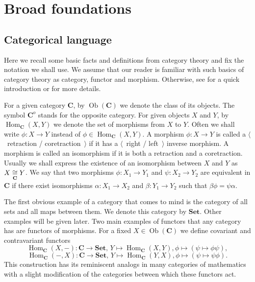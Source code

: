 
\section{
  Broad foundations}\label{SectionBroadFoundations} 


\subsection{
  Categorical language}\label{SubSectionCategoricalLanguage}

Here we recall some basic facts and definitions from category theory and fix
the notation we shall use. We assume that our reader is familiar with such basics of
category theory as category, functor and morphism. Otherwise, see
\cite[chapter 0]{HelLectAndExOnFuncAn} for a quick introduction or
\cite[chapter 1]{KashivShapCatsAndSheavs} for more details.

For a given category $\mathbf{C}$, by $\operatorname{Ob}(\mathbf{C})$ we denote
the class of its objects. The symbol $\mathbf{C}^o$ stands for the opposite
category. For given objects $X$ and $Y$, by 
$\operatorname{Hom}_{\mathbf{C}}(X, Y)$ 
we denote the set of morphisms from $X$ to $Y$. Often we shall write
$\phi:X\to Y$ instead of $\phi\in\operatorname{Hom}_{\mathbf{C}}(X,Y)$. A
morphism $\phi:X\to Y$ is called a $\langle$~retraction / coretraction~$\rangle$
if it has a $\langle$~right / left~$\rangle$ inverse morphism. A morphism 
is called an isomorphism if it is both a retraction and a coretraction. Usually we shall
express the existence of an isomorphism between $X$ and $Y$ as $X\mathrel{\mathop{\cong}\limits_{\mathbf{C}}} Y$.
We say that two morphisms $\phi:X_1\to Y_1$ and $\psi:X_2\to Y_2$ are equivalent
in $\mathbf{C}$ if there exist isomorphisms $\alpha:X_1\to X_2$ and
$\beta:Y_1\to Y_2$ such that $\beta\phi=\psi\alpha$.

The first obvious example of a category that comes to mind is the category of
all sets and all maps between them. We denote this category by $\mathbf{Set}$.
Other examples will be given later. Two main examples of functors that any
category has are functors of morphisms. For a fixed
$X\in\operatorname{Ob}(\mathbf{C})$ we define covariant and contravariant
functors
\[
\operatorname{Hom}_{\mathbf{C}}(X,-)
:\mathbf{C}\to\mathbf{Set},\,
Y\mapsto \operatorname{Hom}_{\mathbf{C}}(X,Y), 
\phi\mapsto(\psi\mapsto \phi\psi),
\]
\[
\operatorname{Hom}_{\mathbf{C}}(-,X)
:\mathbf{C}\to\mathbf{Set},\,
Y\mapsto \operatorname{Hom}_{\mathbf{C}}(Y,X), 
\phi\mapsto(\psi\mapsto \psi\phi).
\]
This construction has its reminiscent analogs in many categories of mathematics
with a slight modification of the categories between which these functors act.

